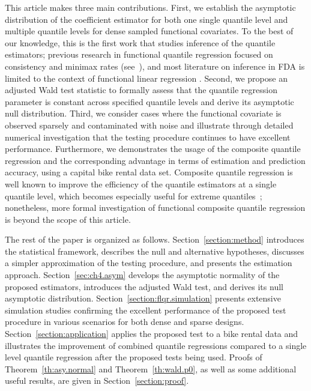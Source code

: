 \documentclass[times,sort&compress,3p]{elsarticle}
\theoremstyle{plain}%
\theoremstyle{definition}
\begin{document}
This article makes three main contributions. First, we establish the asymptotic distribution of the coefficient estimator for both one single quantile level and multiple quantile levels for dense sampled functional covariates. %
To the best of our knowledge, this is the first work that studies inference of the quantile estimators; previous research in functional quantile regression focused on consistency and minimax rates (see~\cite{chen+muller2012,Kato:12}), and most literature on inference in FDA is limited to the context of functional linear regression \citep{Zhang+Chen:07, Horvath+:09, Kong+:16, Su+:17, Cao+:20}. Second, we propose an adjusted Wald test statistic to formally assess that the quantile regression parameter is constant across specified quantile levels and derive its asymptotic null distribution. Third, we consider cases where the functional covariate is observed sparsely and contaminated with noise and illustrate through detailed numerical investigation that the testing procedure continues to have excellent performance. Furthermore, we demonstrates the usage of the composite quantile regression and the corresponding advantage in terms of estimation and prediction accuracy, using a capital bike rental data set. %
Composite quantile regression is well known to improve the efficiency of the quantile estimators at a single quantile level, which becomes especially useful for extreme quantiles~\citep{kehuisinica}; nonetheless, more formal investigation of functional composite quantile regression is beyond the scope of this article.  




The rest of the paper is organized as follows. Section~\ref{section:method} introduces the statistical framework, describes the null and alternative hypotheses, discusses a simpler approximation of the testing procedure, and presents the estimation approach. Section~\ref{sec:ch4.asym} develops the asymptotic normality of the proposed estimators, introduces the adjusted Wald test, and derives its null asymptotic distribution. Section~\ref{section:flqr.simulation} presents extensive simulation studies confirming the excellent performance of the proposed test procedure in various scenarios for both dense and sparse designs. Section~\ref{section:application} applies the proposed test to a bike rental data and illustrates the improvement of combined quantile regressions compared to a single level quantile regression after the proposed tests being used. Proofs of Theorem~\ref{th:asy.normal} and Theorem~\ref{th:wald.p0}, as well as some additional useful results, are given in Section~\ref{section:proof}.  
 
\end{document}

